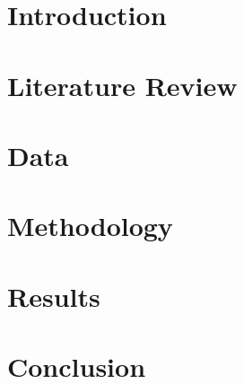 \restoregeometry  %




\newpage

\tableofcontents


\newpage


\chapter{Introduction}


\chapter{Literature Review}


\chapter{Data}


\chapter{Methodology}


\chapter{Results}


\chapter{Conclusion}






